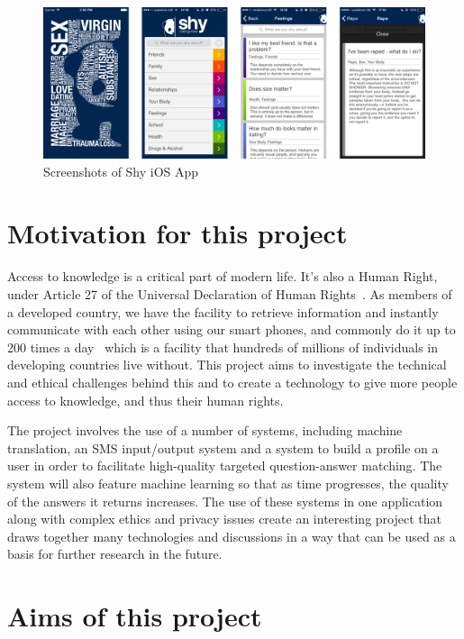 \documentclass[authoryearcitations]{UoYCSproject}
\begin{document}
\begin{figure}[htb] 
\includegraphics[width=\linewidth]{shy-screenshots}
\caption{Screenshots of Shy iOS App}
\label{fig:shy-ios-screenshots}
\end{figure}

\section{Motivation for this project}
Access to knowledge is a critical part of modern life.  It's also a Human Right, under Article 27 of the Universal Declaration of Human Rights~\cite{community1948universal}.  As members of a developed country, we have the facility to retrieve information and instantly communicate with each other using our smart phones, and commonly do it up to 200 times a day~\cite{falaki} which is a facility that hundreds of millions of individuals in developing countries live without.  This project aims to investigate the technical and ethical challenges behind this and to create a technology to give more people access to knowledge, and thus their human rights.

The project involves the use of a number of systems, including machine translation, an SMS input/output system and a system to build a profile on a user in order to facilitate high-quality targeted question-answer matching.  The system will also feature machine learning so that as time progresses, the quality of the answers it returns increases.  The use of these systems in one application along with complex ethics and privacy issues create an interesting project that draws together many technologies and discussions in a way that can be used as a basis for further research in the future.

\section{Aims of this project}
\end{document}
